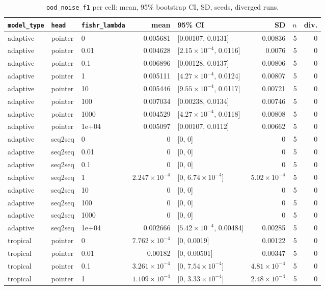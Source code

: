 \documentclass[10pt]{article}
\begin{document}
{\small
\begin{longtable}{lllrlrrr}
\caption{\texttt{ood\_noise\_f1} per cell: mean, 95\% bootstrap CI, SD, seeds, diverged runs.}\label{tab:summary-ood_noise_f1}\\
\toprule
\texttt{model\_type} & \texttt{head} & \texttt{fishr\_lambda} & mean & 95\% CI & SD & $n$ & div.\\
\midrule
\endhead
adaptive & pointer & 0 & 0.005681 & [0.00107, 0.0131] & 0.00836 & 5 & 0\\
adaptive & pointer & 0.01 & 0.004628 & [$2.15\times10^{-4}$, 0.0116] & 0.0076 & 5 & 0\\
adaptive & pointer & 0.1 & 0.006896 & [0.00128, 0.0137] & 0.00806 & 5 & 0\\
adaptive & pointer & 1 & 0.005111 & [$4.27\times10^{-4}$, 0.0124] & 0.00807 & 5 & 0\\
adaptive & pointer & 10 & 0.005446 & [$9.55\times10^{-4}$, 0.0117] & 0.00721 & 5 & 0\\
adaptive & pointer & 100 & 0.007034 & [0.00238, 0.0134] & 0.00746 & 5 & 0\\
adaptive & pointer & 1000 & 0.004529 & [$4.27\times10^{-4}$, 0.0118] & 0.00808 & 5 & 0\\
adaptive & pointer & 1e+04 & 0.005097 & [0.00107, 0.0112] & 0.00662 & 5 & 0\\
adaptive & seq2seq & 0 & 0 & [0, 0] & 0 & 5 & 0\\
adaptive & seq2seq & 0.01 & 0 & [0, 0] & 0 & 5 & 0\\
adaptive & seq2seq & 0.1 & 0 & [0, 0] & 0 & 5 & 0\\
adaptive & seq2seq & 1 & $2.247\times10^{-4}$ & [0, $6.74\times10^{-4}$] & $5.02\times10^{-4}$ & 5 & 0\\
adaptive & seq2seq & 10 & 0 & [0, 0] & 0 & 5 & 0\\
adaptive & seq2seq & 100 & 0 & [0, 0] & 0 & 5 & 0\\
adaptive & seq2seq & 1000 & 0 & [0, 0] & 0 & 5 & 0\\
adaptive & seq2seq & 1e+04 & 0.002666 & [$5.42\times10^{-4}$, 0.00484] & 0.00285 & 5 & 0\\
tropical & pointer & 0 & $7.762\times10^{-4}$ & [0, 0.0019] & 0.00122 & 5 & 0\\
tropical & pointer & 0.01 & 0.00182 & [0, 0.00501] & 0.00347 & 5 & 0\\
tropical & pointer & 0.1 & $3.261\times10^{-4}$ & [0, $7.54\times10^{-4}$] & $4.81\times10^{-4}$ & 5 & 0\\
tropical & pointer & 1 & $1.109\times10^{-4}$ & [0, $3.33\times10^{-4}$] & $2.48\times10^{-4}$ & 5 & 0\\

\end{longtable}}
\end{document}
